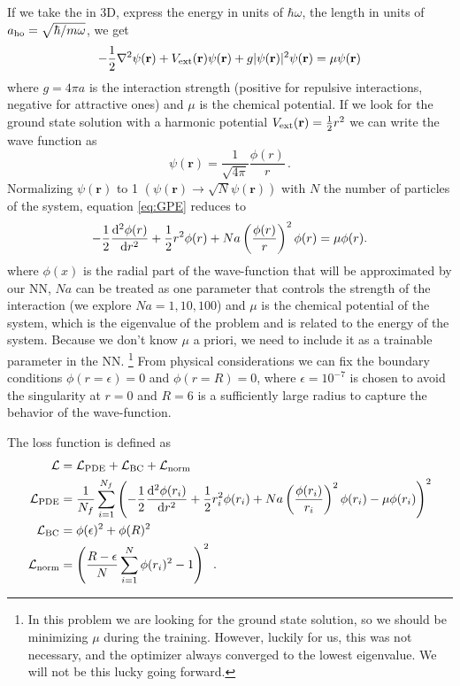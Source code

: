 \documentclass[a4paper, titlepage]{article}
\begin{document}
If we take the \gpe in 3D, express the energy in units of $\hbar \omega$, the
length in units of $a_{\rm ho} = \sqrt{\hbar / m \omega}$, we get
\begin{equation}
    -\frac{1}{2} \nabla^2 \psi(\mathbf r) + V_{\rm ext}(\mathbf r) \psi(\mathbf r) 
    + g |\psi(\mathbf r)|^2 \psi(\mathbf r) = \mu \psi(\mathbf r)
    \label{eq:GPE}
\end{equation}
where $g = 4 \pi a$ is the interaction strength (positive for repulsive 
interactions, negative for attractive ones) and $\mu$ is the chemical potential.
If we look for the ground state solution with a harmonic potential
$V_{\rm ext}(\mathbf r) = \frac{1}{2} r^2$ we can write the wave function as
\begin{equation*}
    \psi(\mathbf r) = \frac{1}{\sqrt{4\pi}}\frac{\phi(r)}{r} \, .
\end{equation*}
Normalizing $\psi(\mathbf r)$ to 1 
$\left( \psi(\mathbf r) \to \sqrt{N} \psi(\mathbf r) \right)$
with $N$ the number of particles of the system, equation \eqref{eq:GPE} reduces 
to
\begin{equation*}
    -\frac{1}{2} \dv[2]{\phi(r)}{r} + \frac{1}{2} r^2 \phi(r) 
    + Na \left(\frac{\phi(r)}{r}\right)^2 \phi(r) = \mu \phi(r).
\end{equation*}
where $\phi(x)$ is the radial part of the wave-function that will be 
approximated by our NN, $Na$ can be treated as one parameter that controls the
strength of the interaction (we explore $Na = 1, 10, 100$) and $\mu$ is the
chemical potential of the system, which is the eigenvalue of the problem and is 
related to the energy of the system.
Because we don't know $\mu$ a priori, we need to include it as a trainable
parameter in the NN.
\footnote{In this problem we are looking for the ground state solution, so we
should be minimizing $\mu$ during the training. However, luckily for us, this
was not necessary, and the optimizer always converged to the lowest eigenvalue.
We will not be this lucky going forward.}
From physical considerations we can fix the boundary conditions 
$\phi(r = \epsilon) = 0$ and $\phi(r = R) = 0$, where $\epsilon = 10^{-7}$ is chosen to
avoid the singularity at $r = 0$ and $R = 6$ is a sufficiently large radius to
capture the behavior of the wave-function.

The loss function is defined as
\begin{equation}
\begin{aligned}
    \mathcal L &= \mathcal L_{\rm PDE} + \mathcal L_{\rm BC} 
        + \mathcal L_{\rm norm} \\
    \mathcal L_{\rm PDE} &= \frac{1}{N_f} \sum_{i=1}^{N_f}
        \left( -\frac{1}{2} \dv[2]{\phi(r_i)}{r} + \frac{1}{2} r_i^2 \phi(r_i) 
        + Na \left(\frac{\phi(r_i)}{r_i}\right)^2 \phi(r_i)
        - \mu \phi(r_i) \right)^2 \\
    \mathcal L_{\rm BC} &= \phi(\epsilon)^2 + \phi(R)^2 \\
    \mathcal L_{\rm norm} &= \left( \frac{R - \epsilon}{N}
        \sum_{i = 1}^N \phi(r_i)^2  - 1 \right)^2 \, .
\end{aligned}
\label{eq:ex1_loss}
\end{equation}
\end{document}
